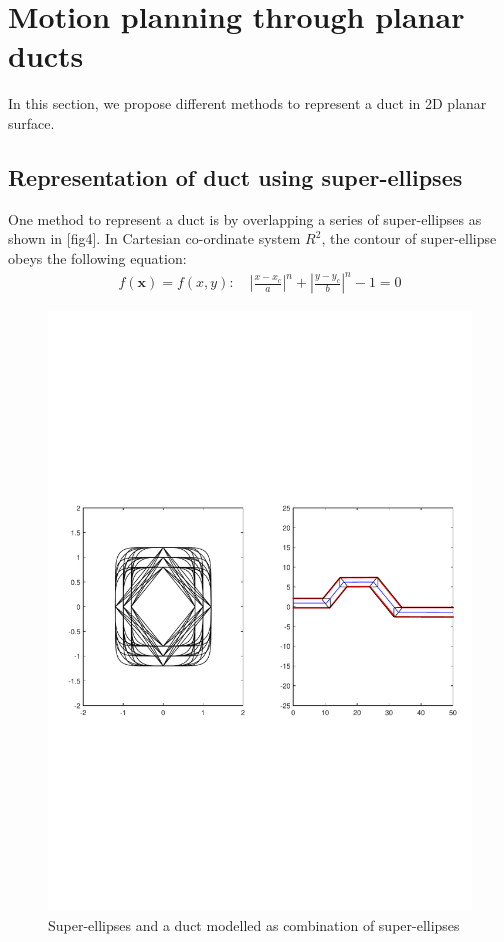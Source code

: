 \documentclass[11pt,a4paper]{article}
\begin{document}
\section{Motion planning through planar ducts}
%
In this section, we propose different methods to represent a duct in 2D planar surface. 
\subsection{Representation of duct using super-ellipses}
%
One method to represent a duct is by overlapping a series of super-ellipses as shown in [fig4]. In Cartesian co-ordinate system $R^2$, the contour of super-ellipse obeys the following equation:
\begin{align}
f(\textbf{x})= f(x,y):\quad \left \vert \frac{x-x_c}{a} \right\vert^n+\left\vert \frac{y-y_c}{b} \right\vert^n-1=0
\end{align}

\begin{figure}[h]
\centering
\includegraphics[scale=0.75]{figures/fig4.pdf}
\caption{ Super-ellipses and a duct modelled as combination of super-ellipses\label{fig:super-ellipses}}
\end{figure}
\end{document}
